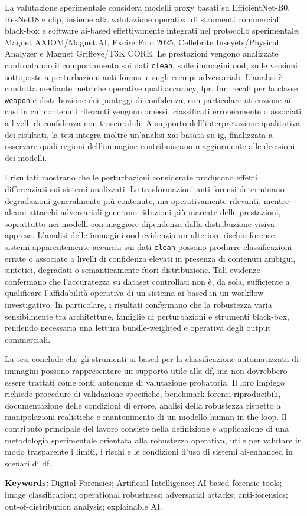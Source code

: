 La valutazione sperimentale considera modelli proxy basati su EfficientNet-B0,
ResNet18 e \gls{clip}, insieme alla valutazione operativa di strumenti
commerciali black-box e software \gls{ai}-based effettivamente integrati nel
protocollo sperimentale: Magnet AXIOM/Magnet.AI, Excire Foto 2025, Cellebrite
Inseyets/Physical Analyzer e Magnet Griffeye/T3K CORE. Le prestazioni
vengono analizzate confrontando il comportamento sui dati \texttt{clean}, sulle
immagini \gls{ood}, sulle versioni sottoposte a perturbazioni anti-forensi e
sugli esempi adversariali. L'analisi è condotta mediante metriche operative
quali accuracy, \gls{fpr}, \gls{fnr}, recall per la classe \texttt{weapon} e
distribuzione dei punteggi di confidenza, con particolare attenzione ai casi in
cui contenuti rilevanti vengono omessi, classificati erroneamente o associati a
livelli di confidenza non trascurabili. A supporto dell'interpretazione
qualitativa dei risultati, la tesi integra inoltre un'analisi \gls{xai} basata
su \gls{ig}, finalizzata a osservare quali regioni dell'immagine contribuiscano
maggiormente alle decisioni dei modelli.

I risultati mostrano che le perturbazioni considerate producono effetti
differenziati sui sistemi analizzati. Le trasformazioni anti-forensi determinano
degradazioni generalmente più contenute, ma operativamente rilevanti, mentre
alcuni attacchi adversariali generano riduzioni più marcate delle prestazioni,
soprattutto nei modelli con maggiore dipendenza dalla distribuzione visiva
appresa. L'analisi delle immagini \gls{ood} evidenzia un ulteriore rischio
forense: sistemi apparentemente accurati sui dati \texttt{clean} possono produrre
classificazioni errate o associate a livelli di confidenza elevati in presenza di contenuti ambigui,
sintetici, degradati o semanticamente fuori distribuzione. Tali evidenze
confermano che l'accuratezza su dataset controllati non è, da sola, sufficiente
a qualificare l'affidabilità operativa di un sistema \gls{ai}-based in un
workflow investigativo.
In particolare, i risultati confermano che la robustezza varia sensibilmente tra
architetture, famiglie di perturbazioni e strumenti black-box, rendendo
necessaria una lettura bundle-weighted e operativa degli output commerciali.

La tesi conclude che gli strumenti \gls{ai}-based per la classificazione
automatizzata di immagini possono rappresentare un supporto utile alla \gls{df},
ma non dovrebbero essere trattati come fonti autonome di valutazione probatoria.
Il loro impiego richiede procedure di validazione specifiche, benchmark forensi
riproducibili, documentazione delle condizioni di errore, analisi della
robustezza rispetto a manipolazioni realistiche e mantenimento di un modello
human-in-the-loop. Il contributo principale del lavoro consiste nella definizione
e applicazione di una metodologia sperimentale orientata alla robustezza
operativa, utile per valutare in modo trasparente i limiti, i rischi e le
condizioni d'uso di sistemi \gls{ai}-enhanced in scenari di \gls{df}.


\vfill

\noindent
\begin{minipage}{\textwidth}
\small
\raggedright
\textbf{Keywords:} Digital Forensics; Artificial Intelligence; AI-based forensic tools;
image classification; operational robustness; adversarial attacks; anti-forensics;
out-of-distribution analysis; explainable AI.
\end{minipage}